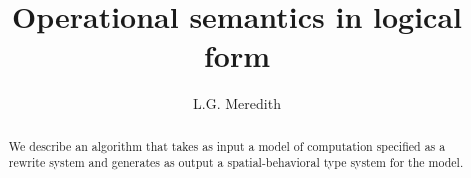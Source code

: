 \def\lastname{Meredith}

\title{Operational semantics in logical form}

\author{ L.G. Meredith }

\maketitle              %


\begin{abstract}

  We describe an algorithm that takes as input a model of computation
  specified as a rewrite system and generates as output a
  spatial-behavioral type system for the model.

\end{abstract}



